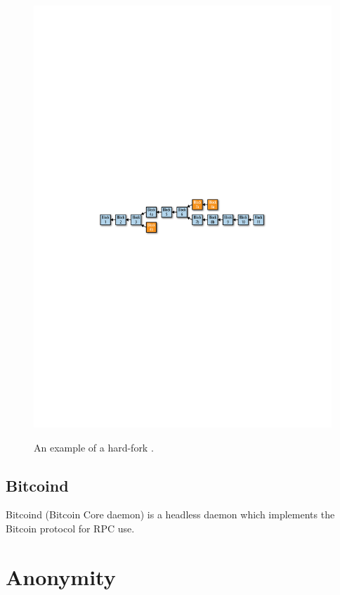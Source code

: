 \begin{figure}[h!]
  \centering
  \includegraphics[width = 15cm]{./figures/hard-fork.pdf}\\[0.5cm] 
  \caption{An example of a hard-fork \cite{RefWorks:doc:5c39e80ae4b0854ae611b047}.}
  \label{fig:hard-fork}
\end{figure}

\subsection{Bitcoind}\label{background:bitcoind}
Bitcoind (Bitcoin Core daemon) is a headless daemon which implements the Bitcoin protocol for RPC use. 

\section{Anonymity}\label{background-anonymity}

